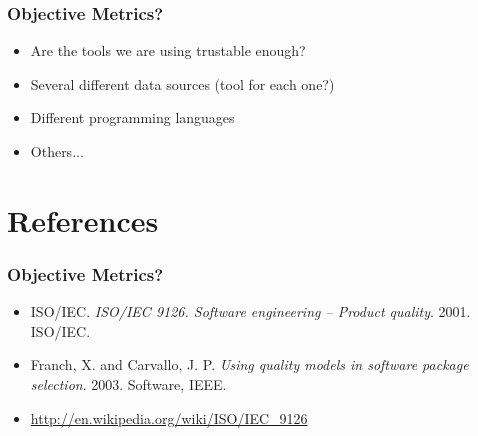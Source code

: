 \documentclass{beamer}
\begin{document}
\begin{frame}
\frametitle{Objective Metrics?}
\begin{center}
\begin{itemize}
 \item Are the tools we are using trustable enough?
 \item Several different data sources (tool for each one?)
 \item Different programming languages
 \item Others...
\end{itemize}
\end{center}
\end{frame}

\section{References}


\begin{frame}
\frametitle{Objective Metrics?}
\begin{center}
\begin{itemize}
\item ISO/IEC.  \textit{ISO/IEC 9126. Software engineering -- Product quality}. 2001. ISO/IEC.
\item Franch, X. and Carvallo, J. P. \textit{Using quality models in software package selection}. 2003. Software, IEEE.
\item \url{http://en.wikipedia.org/wiki/ISO/IEC_9126}
\end{itemize}
\end{center}
\end{frame}
\end{document}
